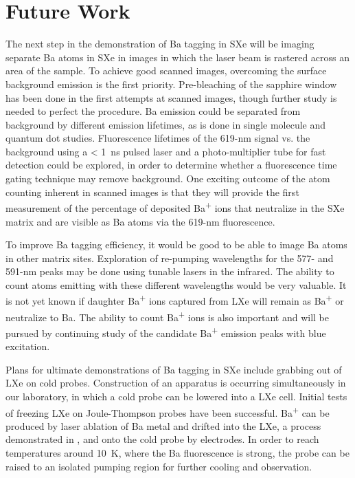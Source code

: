 \section{Future Work}
\label{sec:future}

The next step in the demonstration of Ba tagging in SXe will be imaging separate Ba atoms in SXe in images in which the laser beam is rastered across an area of the sample.  To achieve good scanned images, overcoming the surface background emission is the first priority.  Pre-bleaching of the sapphire window has been done in the first attempts at scanned images, though further study is needed to perfect the procedure.  Ba emission could be separated from background by different emission lifetimes, as is done in single molecule and quantum dot studies.  Fluorescence lifetimes of the 619-nm signal vs. the background using a < 1~ns pulsed laser and a photo-multiplier tube for fast detection could be explored, in order to determine whether a fluorescence time gating technique may remove background.  One exciting outcome of the atom counting inherent in scanned images is that they will provide the first measurement of the percentage of deposited Ba\textsuperscript{+} ions that neutralize in the SXe matrix and are visible as Ba atoms via the 619-nm fluorescence.

To improve Ba tagging efficiency, it would be good to be able to image Ba atoms in other matrix sites.  Exploration of re-pumping wavelengths for the 577- and 591-nm peaks may be done using tunable lasers in the infrared.  The ability to count atoms emitting with these different wavelengths would be very valuable.  It is not yet known if daughter Ba\textsuperscript{+} ions captured from LXe will remain as Ba\textsuperscript{+} or neutralize to Ba.  The ability to count Ba\textsuperscript{+} ions is also important and will be pursued by continuing study of the candidate Ba\textsuperscript{+} emission peaks with blue excitation.

Plans for ultimate demonstrations of Ba tagging in SXe include grabbing out of LXe on cold probes.  Construction of an apparatus is occurring simultaneously in our laboratory, in which a cold probe can be lowered into a LXe cell.  Initial tests of freezing LXe on Joule-Thompson probes have been successful.  Ba\textsuperscript{+} can be produced by laser ablation of Ba metal and drifted into the LXe, a process demonstrated in \cite{Kendy}, and onto the cold probe by electrodes.  In order to reach temperatures around 10~K, where the Ba fluorescence is strong, the probe can be raised to an isolated pumping region for further cooling and observation.

